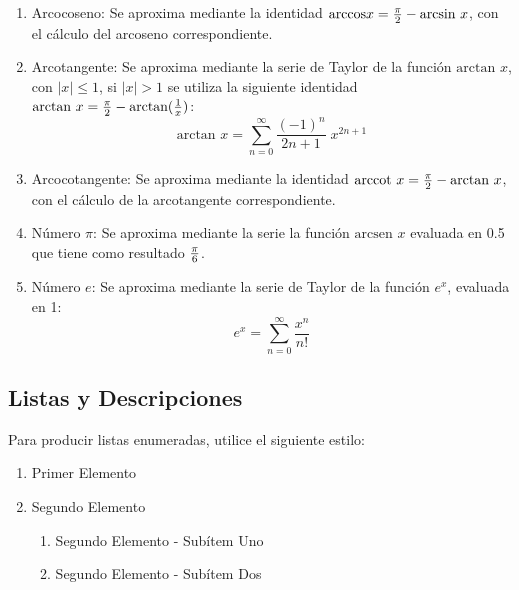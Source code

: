 \documentclass[a4paper,10pt,twocolumn]{article}
\begin{document}
\begin{enumerate}
  		\item Arcocoseno: Se aproxima mediante la identidad $\text{arccos}x={\pi \over 2}-\text{arcsin }x$, con el cálculo del arcoseno correspondiente.
  		
  		\item Arcotangente: Se aproxima mediante la serie de Taylor de la función $\text{arctan }x$, con $|x| \leq 1$, si $|x| > 1$ se utiliza la siguiente identidad $\text{arctan }x={\pi \over 2}-\text{arctan}({1 \over x})$:
  			\begin{equation}
  				\text{arctan }x=\sum _{n=0}^{\infty }{\frac {(-1)^{n}}{2n+1}}\;x^{2n+1}
  			\end{equation}
  			
  		\item Arcocotangente: Se aproxima mediante la identidad $\text{arccot }x={\pi \over 2}-\text{arctan }x$, con el cálculo de la arcotangente correspondiente.
  		
  		\item Número $\pi$: Se aproxima mediante la serie la función $\text{arcsen }x$ evaluada en 0.5 que tiene como resultado $\pi\over 6$.
  		
  		\item Número $e$: Se aproxima mediante la serie de Taylor de la función $e^x$, evaluada en 1:
  			\begin{equation}
  				e^{x}=\sum _{n=0}^{\infty }{\frac {x^{n}}{n!}}
  			\end{equation}
	\end{enumerate}
	

	
	

	\subsection{Listas y Descripciones}\label{sub:lists}
		Para producir listas enumeradas, utilice el siguiente estilo:
		\begin{enumerate}
			\item Primer Elemento
			\item Segundo Elemento
			\begin {enumerate}
				\item {Segundo Elemento - Subítem Uno}
				\item {Segundo Elemento - Subítem Dos}
			\end {enumerate}
		\end{enumerate}
\end{document}
